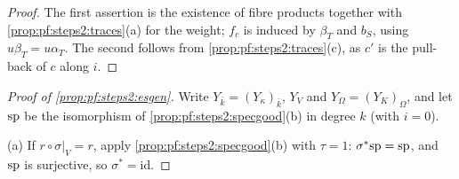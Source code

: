 \begin{proof}
The first assertion is the existence of fibre products together with \cref{prop:pf:steps2:traces}(a)
for the weight; $f_c$ is induced by $\beta_T$ and $b_S$, using $u\beta_T=u\alpha_T$. The second
follows from \cref{prop:pf:steps2:traces}(c), as $c'$ is the pull-back of $c$ along $i$.
\end{proof}

\begin{proof}[Proof of \cref{prop:pf:steps2:esgen}]
Write $Y_{\bar k}=(Y_\kappa)_{\bar k}$, $Y_V$ and $Y_\Omega=(Y_K)_\Omega$, and let $\mathrm{sp}$ be the
isomorphism of \cref{prop:pf:steps2:specgood}(b) in degree $k$ (with $i=0$).

(a) If $r\circ\sigma|_V=r$, apply \cref{prop:pf:steps2:specgood}(b) with $\tau=1$:
$\sigma^\ast\mathrm{sp}=\mathrm{sp}$, and $\mathrm{sp}$ is surjective, so $\sigma^\ast=\mathrm{id}$.


\end{proof}
